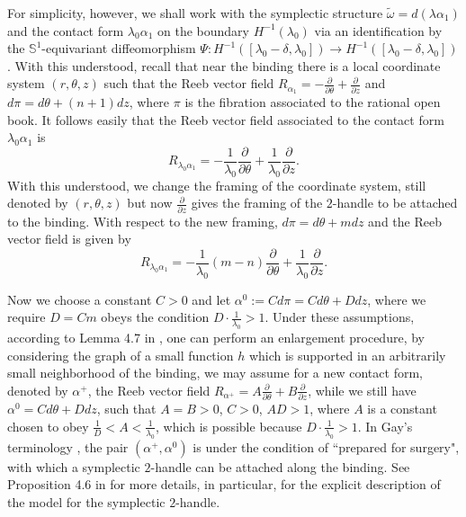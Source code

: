 \documentclass[11pt]{amsart}
\theoremstyle{plain}
\numberwithin{theorem}{section}
\theoremstyle{definition}
\newcommand{\s}{{\mathbb S}}
\begin{document}
For simplicity, however, we shall work with the symplectic structure $\tilde{\omega}=d(\lambda\alpha_1)$ and the
contact form $\lambda_0\alpha_1$ on the boundary $H^{-1}(\lambda_0)$ via an identification by the $\s^1$-equivariant diffeomorphism $\Psi: H^{-1}([\lambda_0-\delta,\lambda_0])\rightarrow H^{-1}([\lambda_0-\delta,\lambda_0])$. With this understood, recall that near the binding there is a local coordinate system $(r,\theta,z)$ such that the Reeb vector field $R_{\alpha_1}=-\frac{\partial}{\partial \theta}+\frac{\partial}{\partial z}$ and $d\pi=d\theta+(n+1) dz$, where $\pi$ is the fibration associated to the rational open book. It follows 
easily that the Reeb vector field associated to the contact form $\lambda_0\alpha_1$ is 
$$
R_{\lambda_0\alpha_1}=-\frac{1}{\lambda_0}\frac{\partial}{\partial \theta}+\frac{1}{\lambda_0}\frac{\partial}{\partial z}.
$$
With this understood, we change the framing of the coordinate system, still denoted by $(r,\theta,z)$ but now
$\frac{\partial}{\partial z}$ gives the framing of the $2$-handle to be attached to the binding. With respect to the
new framing, $d\pi=d\theta+mdz$ and the Reeb vector field is given by 
$$
R_{\lambda_0\alpha_1}=-\frac{1}{\lambda_0}(m-n)\frac{\partial}{\partial \theta}+\frac{1}{\lambda_0}\frac{\partial}{\partial z}.
$$

Now we choose a constant $C>0$ and let $\alpha^0:=Cd\pi=Cd\theta+Ddz$, where we require $D=Cm$ obeys
the condition $D\cdot \frac{1}{\lambda_0}>1$. Under these assumptions, according to Lemma 4.7 in \cite{G},
one can perform an enlargement procedure, by considering the graph of a small function $h$ which is supported 
in an arbitrarily small neighborhood of the binding, we may assume for a new contact form, denoted by
$\alpha^{+}$, the Reeb vector field $R_{\alpha^{+}}=A\frac{\partial}{\partial \theta}+B\frac{\partial}{\partial z}$, while we still have $\alpha^0=Cd\theta+Ddz$, such that $A=B>0$, $C>0$, $AD>1$, where $A$ is a constant chosen to obey $\frac{1}{D}<A< \frac{1}{\lambda_0}$, which is possible because $D\cdot \frac{1}{\lambda_0}>1$. In Gay's terminology \cite{G}, the pair $(\alpha^{+},\alpha^0)$ is under the condition of ``prepared for surgery", with which
a symplectic $2$-handle can be attached along the binding. See Proposition 4.6 in \cite{G} for more details, in particular, for the explicit description of the model for the symplectic $2$-handle. 
\end{document}
